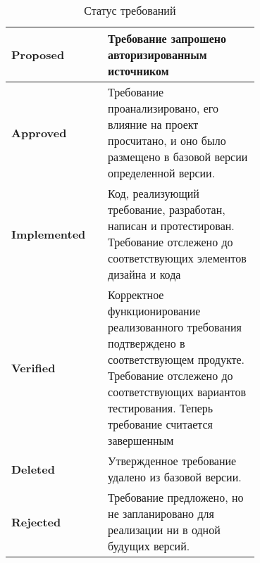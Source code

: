 \begin{longtable}{|p{0.2\linewidth}|p{0.5\linewidth}|} 
	\caption{Статус требований} \label{statusReq} \\
\hline
\textbf{Proposed} & Требование запрошено авторизированным источником \\ \hline
\textbf{Approved} & Требование проанализировано, его влияние на проект просчитано, и оно было размещено в базовой версии определенной версии. \\ \hline
\textbf{Implemented} & Код, реализующий требование, разработан, написан и протестирован. Требование отслежено до соответствующих элементов дизайна и кода \\ \hline
\textbf{Verified} & Корректное функционирование реализованного требования подтверждено в соответствующем продукте. Требование отслежено до соответствующих вариантов тестирования. Теперь требование считается завершенным \\ \hline
\textbf{Deleted} & Утвержденное требование удалено из базовой версии.  \\ \hline
\textbf{Rejected} & Требование предложено, но не запланировано для реализации ни в одной будущих версий. \\ \hline

\end{longtable}
